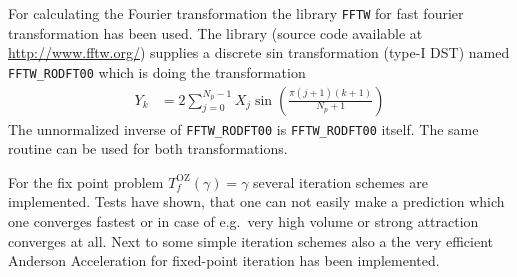 For calculating the Fourier transformation the library \texttt{FFTW} for fast fourier transformation
\cite{FFTW05,FFTW97} has been used. The library (source code available at \url{http://www.fftw.org/}) supplies a discrete sin transformation (type-I DST)
named \verb"FFTW_RODFT00" which is doing the transformation
\begin{align}
Y_k &= 2 \sum_{j=0}^{N_p-1} X_j \sin\left(\frac{\pi(j + 1)(k + 1)}{N_p + 1}\right)
\end{align}
The unnormalized inverse of \verb"FFTW_RODFT00" is \verb"FFTW_RODFT00" itself.
The same routine can be used for both transformations.

For the fix point problem $T^\mathrm{OZ}_f(\gamma)=\gamma$ several iteration schemes are implemented. Tests have shown, that one can not easily make a prediction which one converges fastest or in case of e.g.\ very high volume or strong attraction converges at all. Next to some simple iteration schemes also a the very efficient Anderson Acceleration for fixed-point iteration \cite{Anderson1965,Walker2011,Toth2015} has been implemented.

